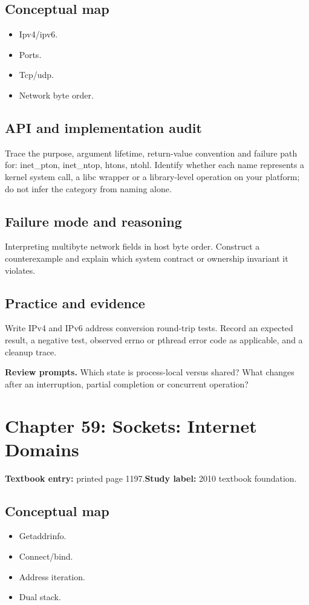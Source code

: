 \documentclass[11pt,letterpaper,oneside]{report}
\begin{document}
\subsection{Conceptual map}
\begin{itemize}
\item Ipv4/ipv6.
\item Ports.
\item Tcp/udp.
\item Network byte order.
\end{itemize}
\subsection{API and implementation audit}
Trace the purpose, argument lifetime, return-value convention and failure path for: inet\_pton, inet\_ntop, htons, ntohl. Identify whether each name represents a kernel system call, a libc wrapper or a library-level operation on your platform; do not infer the category from naming alone.

\subsection{Failure mode and reasoning}
Interpreting multibyte network fields in host byte order. Construct a counterexample and explain which system contract or ownership invariant it violates.

\subsection{Practice and evidence}
Write IPv4 and IPv6 address conversion round-trip tests. Record an expected result, a negative test, observed errno or pthread error code as applicable, and a cleanup trace.

\textbf{Review prompts.} Which state is process-local versus shared? What changes after an interruption, partial completion or concurrent operation?

\section{Chapter 59: Sockets: Internet Domains}
\textbf{Textbook entry:} printed page 1197.\quad \textbf{Study label:} 2010 textbook foundation.

\subsection{Conceptual map}
\begin{itemize}
\item Getaddrinfo.
\item Connect/bind.
\item Address iteration.
\item Dual stack.
\end{itemize}
\end{document}
